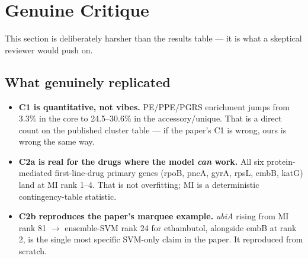 \documentclass[11pt]{article}
\begin{document}
\section{Genuine Critique}
This section is deliberately harsher than the results table --- it is what a skeptical reviewer would push on.

\subsection{What genuinely replicated}
\begin{itemize}
  \item \textbf{C1 is quantitative, not vibes.} PE/PPE/PGRS enrichment jumps from 3.3\% in the core to 24.5--30.6\% in the accessory/unique. That is a direct count on the published cluster table --- if the paper's C1 is wrong, ours is wrong the same way.
  \item \textbf{C2a is real for the drugs where the model \textit{can} work.} All six protein-mediated first-line-drug primary genes (rpoB, pncA, gyrA, rpsL, embB, katG) land at MI rank 1--4. That is not overfitting; MI is a deterministic contingency-table statistic.
  \item \textbf{C2b reproduces the paper's marquee example.} \textit{ubiA} rising from MI rank 81 $\to$ ensemble-SVM rank 24 for ethambutol, alongside embB at rank 2, is the single most specific SVM-only claim in the paper. It reproduced from scratch.
\end{itemize}
\end{document}
